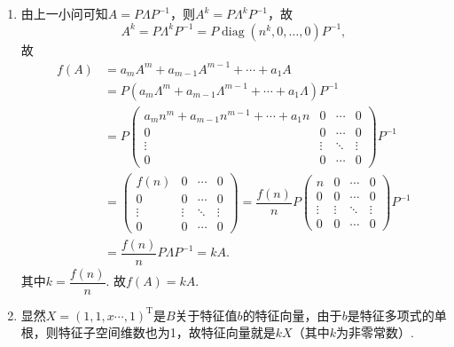 \documentclass[UTF8,12pt,a4paper,fontset=fandol]{ctexart}
\begin{document}
\begin{solve}
\begin{enumerate}
                \item 由上一小问可知$A=P\Lambda P^{-1}$，则$A^k=P\Lambda^kP^{-1}$，故
                      \[A^k=P\Lambda^kP^{-1}=P\operatorname{diag}(n^k,0,\ldots,0)P^{-1},\]
                      故
                      \begin{align*}
                          f(A) & =a_mA^m+a_{m-1}A^{m-1}+\cdots+a_1A                                                                                                   \\
                               & =P(a_m\Lambda^m+a_{m-1}\Lambda^{m-1}+\cdots+a_1\Lambda)P^{-1}                                                               \\
                               & =P\begin{pmatrix}
                                       a_mn^m+a_{m-1}n^{m-1}+\cdots+a_1n & 0 & \cdots & 0 \\ 0 & 0 & \cdots & 0 \\ \vdots & \vdots & \ddots & \vdots \\ 0 & 0 & \cdots & 0
                                   \end{pmatrix}P^{-1} \\
                               & =\begin{pmatrix}
                                      f(n) & 0 & \cdots & 0 \\ 0 & 0 & \cdots & 0 \\ \vdots & \vdots & \ddots & \vdots \\ 0 & 0 & \cdots & 0
                                  \end{pmatrix}=\dfrac{f(n)}{n}P\begin{pmatrix}
                                                                    n & 0 & \cdots & 0 \\ 0 & 0 & \cdots & 0 \\ \vdots & \vdots & \ddots & \vdots \\ 0 & 0 & \cdots & 0
                                                                \end{pmatrix}P^{-1}    \\
                               & =\dfrac{f(n)}{n}P\Lambda P^{-1}=kA.
                      \end{align*}
                      其中$k=\dfrac{f(n)}{n}$. 故$f(A)=kA$.

                \item 显然$X=(1,1,x\cdots,1)^\mathrm{T}$是$B$关于特征值$b$的特征向量，由于$b$是特征多项式的单根，则特征子空间维数也为1，故特征向量就是$kX$（其中$k$为非零常数）.


\end{enumerate}
\end{solve}
\end{document}
